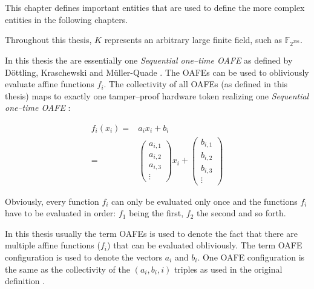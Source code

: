 %
%
\label{sec:rae-definitions}

This chapter defines important entities that are used to define the more complex
entities in the following chapters.

\label{sec:field}

\label{def:field} Throughout this thesis, $K$ represents an arbitrary large
finite field, such as $\mathbb{F}_{2^{256}}$.




In this thesis the  are
essentially one \emph{Sequential one--time OAFE} as defined by Döttling,
Kraschewski and Müller-Quade \cite{davidgoliath}. The OAFEs can be used to
obliviously evaluate affine functions $f_i$. The collectivity of all OAFEs (as
defined in this thesis) maps to exactly one tamper--proof hardware token
realizing one \emph{Sequential one--time OAFE} \cite{davidgoliath}:

\begin{align*}
  f_i(x_i) = &
  a_ix_i + b_i \\
%
  = &
\begin{pmatrix}a_{i,1}\\a_{i,2}\\a_{i,3}\\\vdots\end{pmatrix}x_i +
\begin{pmatrix}b_{i,1}\\b_{i,2}\\b_{i,3}\\\vdots\end{pmatrix}
\end{align*}

\noindent{}Obviously, every function $f_i$ can only be evaluated only once and
the functions $f_i$ have to be evaluated in order: $f_1$ being the first, $f_2$
the second and so forth.

In this thesis usually the term OAFEs is used to denote the fact that there are
multiple affine functions ($f_i$) that can be evaluated obliviously. The term
OAFE configuration is used to denote the vectors $a_i$ and $b_i$. One OAFE
configuration is the same as the collectivity of the $(a_i, b_i, i)$ triples as
used in the original definition \cite{davidgoliath}.


%
%
\label{sec:drav}

